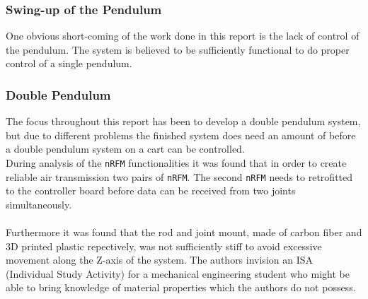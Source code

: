 \subsubsection{Swing-up of the Pendulum} %
\label{ssub:swing_up_of_the_pendulum}
One obvious short-coming of the work done in this report is the lack of control of the pendulum.
The system is believed to be sufficiently functional to do proper control of a single pendulum.

\subsubsection{Double Pendulum} %
\label{ssub:double_pendulum}
The focus throughout this report has been to develop a double pendulum system, but due to different problems the finished system does need an amount of before a double pendulum system on a cart can be controlled.
\\
During analysis of the \texttt{nRFM} functionalities it was found that in order to create reliable air transmission two pairs of \texttt{nRFM}.
The second \texttt{nRFM} needs to retrofitted to the controller board before data can be received from two joints simultaneously.
\\~\\
Furthermore it was found that the rod and joint mount, made of carbon fiber and 3D printed plastic repectively, was not sufficiently stiff to avoid excessive movement along the Z-axis of the system.
The authors invision an ISA (Individual Study Activity) for a mechanical engineering student who might be able to bring knowledge of material properties which the authors do not possess.
